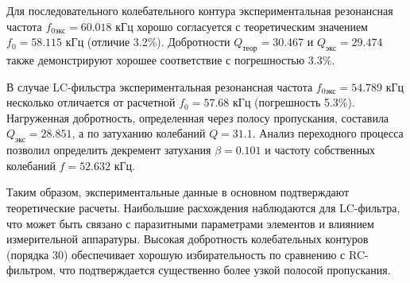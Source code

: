 \documentclass[a4paper, 12pt]{article}
\begin{document}
	Для последовательного колебательного контура экспериментальная резонансная частота $f_{0\text{экс}} = 60.018$ кГц хорошо согласуется с теоретическим значением $f_0 = 58.115$ кГц (отличие 3.2\%). Добротности $Q_{\text{теор}} = 30.467$ и $Q_{\text{экс}} = 29.474$ также демонстрируют хорошее соответствие с погрешностью 3.3\%.
	
	В случае LC-фильстра экспериментальная резонансная частота $f_{0\text{экс}} = 54.789$ кГц несколько отличается от расчетной $f_0 = 57.68$ кГц (погрешность 5.3\%). Нагруженная добротность, определенная через полосу пропускания, составила $Q_{\text{экс}} = 28.851$, а по затуханию колебаний $Q = 31.1$. Анализ переходного процесса позволил определить декремент затухания $\beta = 0.101$ и частоту собственных колебаний $f = 52.632$ кГц.
	
	Таким образом, экспериментальные данные в основном подтверждают теоретические расчеты. Наибольшие расхождения наблюдаются для LC-фильтра, что может быть связано с паразитными параметрами элементов и влиянием измерительной аппаратуры. Высокая добротность колебательных контуров (порядка 30) обеспечивает хорошую избирательность по сравнению с RC-фильтром, что подтверждается существенно более узкой полосой пропускания.
	
\end{document}

